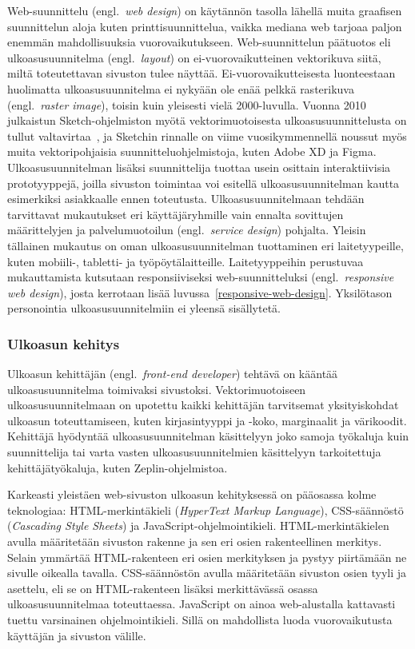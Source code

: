 \documentclass[finnish, 12pt, a4paper, elec, utf8, a-1b, online]{aaltothesis}
\begin{document}
Web-suunnittelu (engl.~\textit{web design}) on käytännön tasolla lähellä muita
graafisen suunnittelun aloja kuten printtisuunnittelua, vaikka mediana web
tarjoaa paljon enemmän mahdollisuuksia vuorovaikutukseen. Web-suunnittelun
päätuotos eli ulkoasusuunnitelma (engl.~\textit{layout}) on ei-vuorovaikutteinen
vektorikuva siitä, miltä toteutettavan sivuston tulee näyttää.
Ei-vuorovaikutteisesta luonteestaan huolimatta ulkoasusuunnitelma ei nykyään ole
enää pelkkä rasterikuva (engl.~\textit{raster image}), toisin kuin yleisesti
vielä 2000-luvulla. Vuonna 2010 julkaistun Sketch-ohjelmiston myötä
vektorimuotoisesta ulkoasusuunnittelusta on tullut
valtavirtaa~\cite{webdesignmuseum_2022}, ja Sketchin rinnalle on viime
vuosikymmennellä noussut myös muita vektoripohjaisia suunnitteluohjelmistoja,
kuten Adobe XD ja Figma. Ulkoasusuunnitelman lisäksi suunnittelija tuottaa usein
osittain interaktiivisia prototyyppejä, joilla sivuston toimintaa voi esitellä
ulkoasusuunnitelman kautta esimerkiksi asiakkaalle ennen toteutusta.
Ulkoasusuunnitelmaan tehdään tarvittavat mukautukset eri käyttäjäryhmille vain
ennalta sovittujen määrittelyjen ja palvelumuotoilun (engl.~\textit{service
design}) pohjalta. Yleisin tällainen mukautus on oman ulkoasusuunnitelman
tuottaminen eri laitetyypeille, kuten mobiili-, tabletti- ja työpöytälaitteille.
Laitetyyppeihin perustuvaa mukauttamista kutsutaan responsiiviseksi
web-suunnitteluksi (engl.~\textit{responsive web design}), josta kerrotaan lisää
luvussa~\ref{responsive-web-design}. Yksilötason personointia
ulkoasusuunnitelmiin ei yleensä sisällytetä.

\subsubsection{Ulkoasun kehitys}\label{background-web-development}

Ulkoasun kehittäjän (engl.~\textit{front-end developer}) tehtävä on kääntää
ulkoasusuunnitelma toimivaksi sivustoksi. Vektorimuotoiseen ulkoasusuunnitelmaan
on upotettu kaikki kehittäjän tarvitsemat yksityiskohdat ulkoasun
toteuttamiseen, kuten kirjasintyyppi ja -koko, marginaalit ja värikoodit.
Kehittäjä hyödyntää ulkoasusuunnitelman käsittelyyn joko samoja työkaluja kuin
suunnittelija tai varta vasten ulkoasusuunnitelmien käsittelyyn tarkoitettuja
kehittäjätyökaluja, kuten Zeplin-ohjelmistoa.

Karkeasti yleistäen web-sivuston ulkoasun kehityksessä on pääosassa kolme
teknologiaa: HTML-merkintäkieli (\textit{HyperText Markup Language}),
CSS-säännöstö (\textit{Cascading Style Sheets}) ja JavaScript-ohjelmointikieli.
HTML-merkintäkielen avulla määritetään sivuston rakenne ja sen eri osien
rakenteellinen merkitys. Selain ymmärtää HTML-rakenteen eri osien merkityksen ja
pystyy piirtämään ne sivulle oikealla tavalla. CSS-säännöstön avulla määritetään
sivuston osien tyyli ja asettelu, eli se on HTML-rakenteen lisäksi merkittävässä
osassa ulkoasusuunnitelmaa toteuttaessa. JavaScript on ainoa web-alustalla
kattavasti tuettu varsinainen ohjelmointikieli. Sillä on mahdollista luoda
vuorovaikutusta käyttäjän ja sivuston välille.
\end{document}
